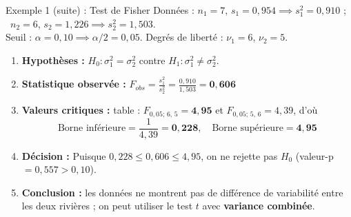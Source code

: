 \documentclass{BeamerTemplate}
\begin{document}
\begin{frame}[t]{Exemple 1 (suite) : Test de Fisher}
  Données : $n_1 = 7$, $s_1 = 0{,}954 \implies s_1^2 = 0{,}910$ ; \
  $n_2 = 6$, $s_2 = 1{,}226 \implies s_2^2 = 1{,}503$. \\
  Seuil : $\alpha = 0{,}10 \implies \alpha/2 = 0{,}05$. Degrés de liberté : $\nu_1 = 6$, $\nu_2 = 5$.

  \medskip
  \begin{enumerate}\itemsep 2mm
    \item \textbf{Hypothèses :} $H_0: \sigma_1^2 = \sigma_2^2$ contre $H_1: \sigma_1^2 \ne \sigma_2^2$.
    \item \textbf{Statistique observée :}
      $\displaystyle F_{obs} = \frac{s_1^2}{s_2^2} = \frac{0{,}910}{1{,}503} = \mathbf{0{,}606}$
    \item<2-> \textbf{Valeurs critiques :}
      table : $F_{0{,}05;\, 6,\, 5} = \mathbf{4{,}95}$ et $F_{0{,}05;\, 5,\, 6} = 4{,}39$, d'où
      $$\text{Borne inférieure} = \frac{1}{4{,}39} = \mathbf{0{,}228}, \quad \text{Borne supérieure} = \mathbf{4{,}95}$$
    \item<2-> \textbf{Décision :}
      Puisque $0{,}228 \le 0{,}606 \le 4{,}95$, on \alert{ne rejette pas $H_0$} (valeur-p $= 0{,}557 > 0{,}10$).
    \item<2-> \textbf{Conclusion :} les données ne montrent pas de différence de variabilité entre les deux rivières ; on peut utiliser le test $t$ avec \textbf{variance combinée}.
  \end{enumerate}
\end{frame}
\end{document}
